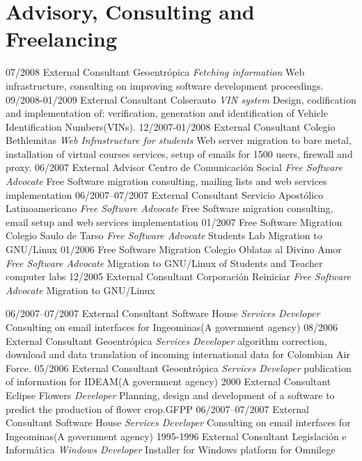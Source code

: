 \section{Advisory, Consulting and Freelancing}
\begin{entrylist}
  \entry
    {07/2008}
    {External Consultant}
    {Geoentrópica {\sl Fetching information}}
    {Web infrastructure, consulting on improving software development proceedings.}
  \entry
    {09/2008-01/2009}
    {External Consultant}
    {Colserauto {\sl VIN system}}
    {Design, codification and implementation of:  verification, generation and 
    identification of Vehicle Identification Numbers(VINs).}
    \entry
    {12/2007-01/2008}
    {External Consultant}
    {Colegio Bethlemitas {\sl Web Infrastructure for students}}
    {Web server migration to bare metal, installation of virtual courses services,
    setup of emails for 1500 users, firewall and proxy.}
  \entry
    {06/2007}
    {External Advisor}
    {Centro de Comunicación Social \sl{Free Software Advocate}}
    {Free Software migration consulting, mailing lists and web services implementation}
  \entry
    {06/2007–07/2007}
    {External Consultant}
    {Servicio Apostólico Latinoamericano {\sl Free Software Advocate}}
    {Free Software migration consulting, email setup and web services implementation}
    \entry
    {01/2007}
    {Free Software Migration}
    {Colegio Saulo de Tarso {\sl Free Software Advocate}}
    {Students Lab Migration to GNU/Linux}
  \entry
    {01/2006}
    {Free Software Migration}
    {Colegio Oblatas al Divino Amor {\sl Free Software Advocate}}
    {Migration to GNU/Linux of Students and Teacher computer labs}
  \entry
    {12/2005}
    {External Consultant}
    {Corporación Reiniciar {\sl Free Software Advocate}}
    {Migration to GNU/Linux}
\end{entrylist}

\begin{entrylist}
  \entry
    {06/2007–07/2007}
    {External Consultant}
    {Software House {\sl Services Developer}}
    {Consulting on email interfaces for Ingeominas(A government agency)}
  \entry
    {08/2006}
    {External Consultant}
    {Geoentrópica {\sl Services Developer}}
    {algorithm correction, download and data translation of 
    incoming international data for Colombian Air Force.}
  \entry
    {05/2006}
    {External Consultant}
    {Geoentrópica {\sl Services Developer}}
    {publication of information for IDEAM(A government agency)}
  \entry
    {2000}
    {External Consultant}
    {Eclipse Flowers {\sl Developer}}
    {Planning, design and development of a software to predict the production of flower crop.GFPP}
  \entry
    {06/2007–07/2007}
    {External Consultant}
    {Software House {\sl Services Developer}}
    {Consulting on email interfaces for Ingeominas(A government agency)}
  \entry
    {1995-1996}
    {External Consultant}
    {Legislación e Informática {\sl Windows Developer}}
    {Installer for Windows platform for Omnilege}
\end{entrylist}
